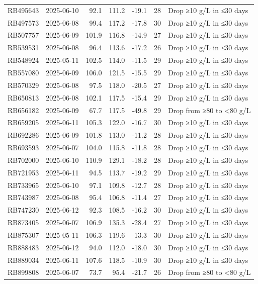 \documentclass[
]{article}
\begin{document}
\begin{longtable}[t]{llrrrrl}
RB495643 & 2025-06-10 & 92.1 & 111.2 & -19.1 & 28 & Drop ≥10 g/L in ≤30 days\\
\addlinespace
RB497573 & 2025-06-08 & 99.4 & 117.2 & -17.8 & 30 & Drop ≥10 g/L in ≤30 days\\
RB507757 & 2025-06-09 & 101.9 & 116.8 & -14.9 & 27 & Drop ≥10 g/L in ≤30 days\\
RB539531 & 2025-06-08 & 96.4 & 113.6 & -17.2 & 26 & Drop ≥10 g/L in ≤30 days\\
RB548924 & 2025-05-11 & 102.5 & 114.0 & -11.5 & 29 & Drop ≥10 g/L in ≤30 days\\
RB557080 & 2025-06-09 & 106.0 & 121.5 & -15.5 & 29 & Drop ≥10 g/L in ≤30 days\\
\addlinespace
RB570329 & 2025-06-08 & 97.5 & 118.0 & -20.5 & 27 & Drop ≥10 g/L in ≤30 days\\
RB650813 & 2025-06-08 & 102.1 & 117.5 & -15.4 & 29 & Drop ≥10 g/L in ≤30 days\\
RB656182 & 2025-06-09 & 67.7 & 117.5 & -49.8 & 29 & Drop from ≥80 to <80 g/L\\
RB659205 & 2025-06-11 & 105.3 & 122.0 & -16.7 & 30 & Drop ≥10 g/L in ≤30 days\\
RB692286 & 2025-06-09 & 101.8 & 113.0 & -11.2 & 28 & Drop ≥10 g/L in ≤30 days\\
\addlinespace
RB693593 & 2025-06-07 & 104.0 & 115.8 & -11.8 & 28 & Drop ≥10 g/L in ≤30 days\\
RB702000 & 2025-06-10 & 110.9 & 129.1 & -18.2 & 28 & Drop ≥10 g/L in ≤30 days\\
RB721953 & 2025-06-11 & 94.5 & 113.7 & -19.2 & 29 & Drop ≥10 g/L in ≤30 days\\
RB733965 & 2025-06-10 & 97.1 & 109.8 & -12.7 & 28 & Drop ≥10 g/L in ≤30 days\\
RB743987 & 2025-06-08 & 95.4 & 106.8 & -11.4 & 27 & Drop ≥10 g/L in ≤30 days\\
\addlinespace
RB747230 & 2025-06-12 & 92.3 & 108.5 & -16.2 & 30 & Drop ≥10 g/L in ≤30 days\\
RB873405 & 2025-06-07 & 106.9 & 135.3 & -28.4 & 27 & Drop ≥10 g/L in ≤30 days\\
RB875307 & 2025-05-11 & 106.3 & 119.6 & -13.3 & 30 & Drop ≥10 g/L in ≤30 days\\
RB888483 & 2025-06-12 & 94.0 & 112.0 & -18.0 & 30 & Drop ≥10 g/L in ≤30 days\\
RB889034 & 2025-06-11 & 107.6 & 118.5 & -10.9 & 30 & Drop ≥10 g/L in ≤30 days\\
\addlinespace
RB899808 & 2025-06-07 & 73.7 & 95.4 & -21.7 & 26 & Drop from ≥80 to <80 g/L\\

\end{longtable}
\end{document}
